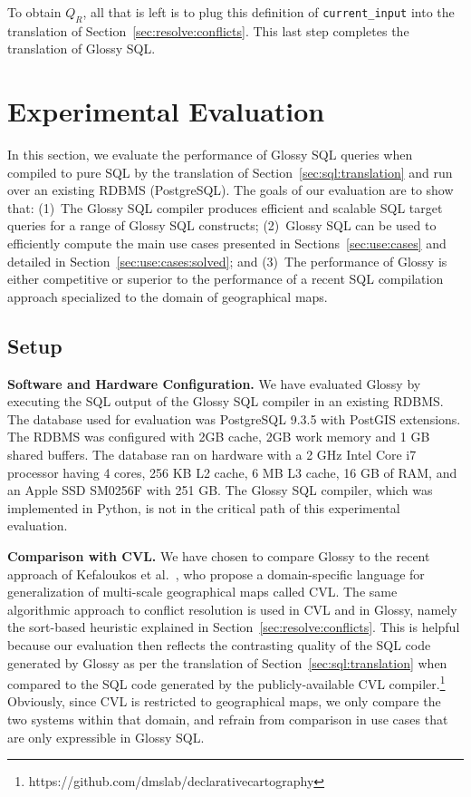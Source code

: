 \documentclass[11pt, oneside]{report}
\newcommand{\minisec}[1]{\noindent\textbf{#1.}}
\begin{document}
{To obtain $Q_R$, all that is left is to plug  this definition of \texttt{current\_input} into the translation of Section~\ref{sec:resolve:conflicts}. This last step completes the translation of Glossy SQL.

\section{Experimental Evaluation}
\label{sec:experimental:evaluation}

In this section, we evaluate the performance of Glossy SQL queries when compiled to pure SQL by the  translation of Section~\ref{sec:sql:translation} and run over an existing RDBMS (PostgreSQL). The goals of our evaluation are to show that: 
(1)~The Glossy SQL compiler produces efficient and scalable SQL target queries for a range of Glossy SQL constructs; (2)~Glossy SQL can be used to efficiently compute the main use cases presented in Sections~\ref{sec:use:cases} and detailed in Section~\ref{sec:use:cases:solved}; and (3)~The performance of Glossy is either competitive or superior to the performance of a recent SQL compilation approach specialized to the domain of geographical maps. 


\subsection{Setup}
\minisec{Software and Hardware Configuration}
We have evaluated Glossy by executing the SQL output of the Glossy SQL compiler in an existing RDBMS. The database used for evaluation was PostgreSQL 9.3.5 with PostGIS extensions. The RDBMS was configured with 2GB cache, 2GB work memory and 1 GB shared buffers. The database ran on hardware with a 2 GHz Intel Core i7 processor having 4 cores, 256 KB L2 cache, 6 MB L3 cache, 16 GB of RAM, and an Apple SSD SM0256F with 251 GB. The Glossy SQL compiler, which was implemented in Python, is not in the critical path of this experimental evaluation.

\minisec{Comparison with CVL}
We have chosen to compare Glossy to the recent approach of Kefaloukos et al.~\cite{KefaloukosSZ14:CVL}, who propose a domain-specific language for generalization of multi-scale geographical maps called CVL. The same algorithmic approach to conflict resolution is used in CVL and in Glossy, namely the sort-based heuristic explained in Section~\ref{sec:resolve:conflicts}. This is helpful because our evaluation then reflects the contrasting quality of the SQL code generated by Glossy as per the translation of Section~\ref{sec:sql:translation} when compared to the SQL code generated by the publicly-available CVL compiler.\footnote{https://github.com/dmslab/declarativecartography} Obviously, since CVL is restricted to geographical maps, we only compare the two systems within that domain, and refrain from comparison in use cases that are only expressible in Glossy SQL.  

}
\end{document}
